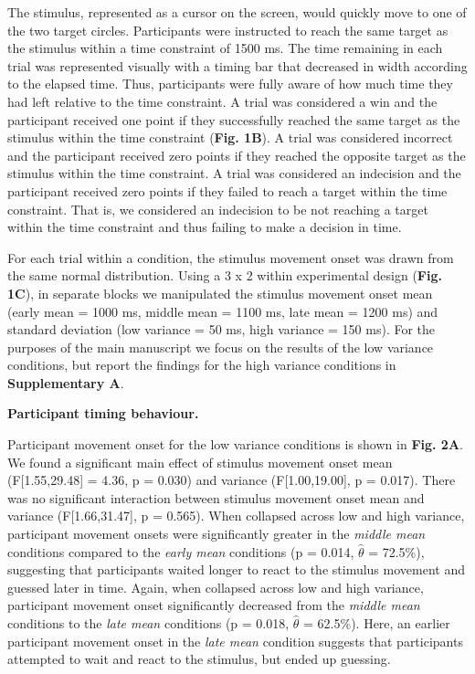 \documentclass[12pt]{article}
\newcommand\boldblue[1]{\textcolor{mydarkblue}{\textbf{#1}}}
\begin{document}
\vspace{-5mm}
\noindent The stimulus, represented as a cursor on the screen, would quickly move to one of the two target circles. Participants were instructed to reach the same target as the stimulus within a time constraint of 1500 ms. The time remaining in each trial was represented visually with a timing bar that decreased in width according to the elapsed time. Thus, participants were fully aware of how much time they had left relative to the time constraint. A trial was considered a win and the participant received one point if they successfully reached the same target as the stimulus within the time constraint (\boldblue{Fig. 1B}). A trial was considered incorrect and the participant received zero points if they reached the opposite target as the stimulus within the time constraint. A trial was considered an indecision and the participant received zero points if they failed to reach a target within the time constraint. That is, we considered an indecision to be not reaching a target within the time constraint and thus failing to make a decision in time.

For each trial within a condition, the stimulus movement onset was drawn from the same normal distribution. Using a 3 x 2 within experimental design (\boldblue{Fig. 1C}), in separate blocks we manipulated the stimulus movement onset mean (early mean = 1000 ms, middle mean = 1100 ms, late mean = 1200 ms) and standard deviation (low variance = 50 ms, high variance = 150 ms). For the purposes of the main manuscript we focus on the results of the low variance conditions, but report the findings for the high variance conditions in \boldblue{Supplementary A}.

\vspace*{2mm}
\noindent \boldblue{{{Participant timing behaviour.}}}

\noindent Participant movement onset for the low variance conditions is shown in \boldblue{Fig. 2A}. We found a significant main effect of stimulus movement onset mean (F[1.55,29.48] = 4.36, p = 0.030) and variance (F[1.00,19.00], p = 0.017). There was no significant interaction between stimulus movement onset mean and variance (F[1.66,31.47], p = 0.565). When collapsed across low and high variance, participant movement onsets were significantly greater in the \emph{middle mean} conditions compared to the \emph{early mean} conditions (p = 0.014, $\hat{\theta}$ = 72.5\%), suggesting that participants waited longer to react to the stimulus movement and guessed later in time. Again, when collapsed across low and high variance, participant movement onset significantly decreased from the \emph{middle mean} conditions to the \emph{late mean} conditions (p = 0.018, $\hat{\theta}$ = 62.5\%). Here, an earlier participant movement onset in the \emph{late mean} condition suggests that participants attempted to wait and react to the stimulus, but ended up guessing.
\end{document}
